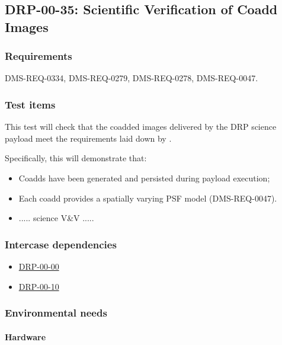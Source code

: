 \subsection{DRP-00-35: Scientific Verification of Coadd Images}
\label{drp-00-35}

\subsubsection{Requirements}

DMS-REQ-0334, DMS-REQ-0279, DMS-REQ-0278, DMS-REQ-0047.

\subsubsection{Test items}
\label{drp-00-35-items}

This test will check that the coadded images  delivered by the DRP science
payload meet the requirements laid down by .

Specifically, this will demonstrate that:

\begin{itemize}

  \item{Coadds have been generated and persisted during payload execution;}
  \item{Each coadd provides a spatially varying PSF model (DMS-REQ-0047).}
  \item{..... science V\&V .....}

\end{itemize}

\subsubsection{Intercase dependencies}

\begin{itemize}

  \item{\hyperref[drp-00-00]{DRP-00-00}}
  \item{\hyperref[drp-00-10]{DRP-00-10}}

\end{itemize}

\subsubsection{Environmental needs}

\paragraph{Hardware}

